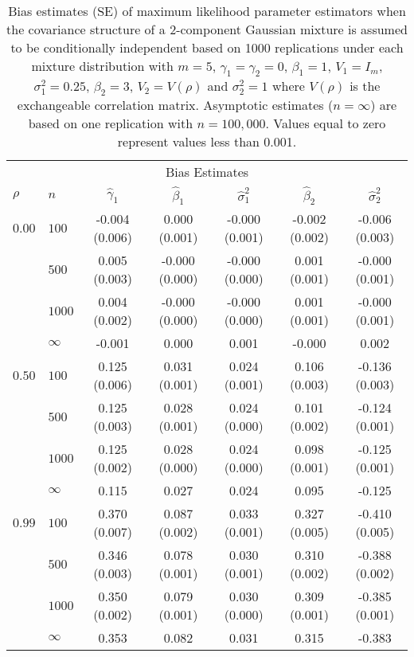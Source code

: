 \documentclass[10pt]{article}
\begin{document}
\begin{table}[ht]
\begin{center}
\begin{tabular}{llccccc}
   \hline \multicolumn{7}{c}{Bias Estimates}\\ $\rho$ & $n$ & $\widehat{\gamma}_1$ & $\widehat{\beta}_1$ & $\widehat{\sigma}^2_1$ & $\widehat{\beta}_2$ & $\widehat{\sigma}^2_2$ \\ 
   \hline$0.00$ & $100$ & -0.004 (0.006) & 0.000 (0.001) & -0.000 (0.001) & -0.002 (0.002) & -0.006 (0.003) \\ 
    & $500$ & 0.005 (0.003) & -0.000 (0.000) & -0.000 (0.000) & 0.001 (0.001) & -0.000 (0.001) \\ 
    & $1000$ & 0.004 (0.002) & -0.000 (0.000) & -0.000 (0.000) & 0.001 (0.001) & -0.000 (0.001) \\ 
    & $\infty$ & -0.001 & 0.000 & 0.001 & -0.000 & 0.002 \\ 
  $0.50$ & $100$ & 0.125 (0.006) & 0.031 (0.001) & 0.024 (0.001) & 0.106 (0.003) & -0.136 (0.003) \\ 
    & $500$ & 0.125 (0.003) & 0.028 (0.001) & 0.024 (0.000) & 0.101 (0.002) & -0.124 (0.001) \\ 
    & $1000$ & 0.125 (0.002) & 0.028 (0.000) & 0.024 (0.000) & 0.098 (0.001) & -0.125 (0.001) \\ 
    & $\infty$ & 0.115 & 0.027 & 0.024 & 0.095 & -0.125 \\ 
  $0.99$ & $100$ & 0.370 (0.007) & 0.087 (0.002) & 0.033 (0.001) & 0.327 (0.005) & -0.410 (0.005) \\ 
    & $500$ & 0.346 (0.003) & 0.078 (0.001) & 0.030 (0.001) & 0.310 (0.002) & -0.388 (0.002) \\ 
    & $1000$ & 0.350 (0.002) & 0.079 (0.001) & 0.030 (0.000) & 0.309 (0.001) & -0.385 (0.001) \\ 
    & $\infty$ & 0.353 & 0.082 & 0.031 & 0.315 & -0.383 \\ 
   \hline\end{tabular}
\caption{Bias estimates (SE) of maximum likelihood parameter estimators when the covariance structure of a 2-component Gaussian mixture is assumed to be conditionally independent based on 1000 replications under each mixture distribution with $m=5$, $\gamma_1=\gamma_2=0$, $\beta_{1}=1$, $V_1=I_{m}$, $\sigma_1^{2}=0.25$, $\beta_2=3$, $V_2=V(\rho)$ and $\sigma_2^{2}=1$ where $V(\rho)$ is the exchangeable correlation matrix. Asymptotic estimates ($n=\infty$) are based on one replication with $n=100,000$. Values equal to zero represent values less than 0.001.}
\label{tab:dep1}
\end{center}
\end{table}\clearpage
\end{document}
